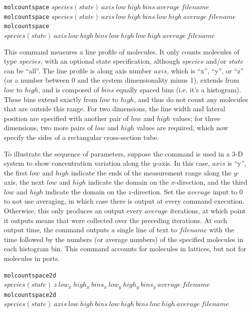 \documentclass {scrbook}
\newcommand {\ttt} {\texttt}
\begin{document}
\begin{description}
\item{\ttt{molcountspace} $species(state)\ axis\ low\ high\ bins\ average\ filename$\\
\ttt{molcountspace} $species(state)\ axis\ low\ high\ bins\ low\ high\ average\ filename$\\
\ttt{molcountspace} $species(state)\ axis\ low\ high\ bins\ low\ high\ low\ high\ average\ filename$}

This command measures a line profile of molecules. It only counts molecules of type $species$, with an optional state specification, although $species$ and/or $state$ can be ``all''. The line profile is along axis number $axis$, which is ``x'', ``y'', or ``z'' (or a number between 0 and the system dimensionality minus 1), extends from $low$ to $high$, and is composed of $bins$ equally spaced bins (i.e. it's a histogram). These bins extend exactly from $low$ to $high$, and thus do not count any molecules that are outside this range. For two dimensions, the line width and lateral position are specified with another pair of $low$ and $high$ values; for three dimensions, two more pairs of $low$ and $high$ values are required, which now specify the sides of a rectangular cross-section tube.

To illustrate the sequence of parameters, suppose the command is used in a 3-D system to show concentration variation along the $y$-axis. In this case, $axis$ is ``y'', the first $low$ and $high$ indicate the ends of the measurement range along the $y$-axis, the next $low$ and $high$ indicate the domain on the $x$-direction, and the third $low$ and $high$ indicate the domain on the $z$-direction. Set the $average$ input to 0 to not use averaging, in which case there is output at every command execution. Otherwise, this only produces an output every $average$ iterations, at which point it outputs means that were collected over the preceding iterations. At each output time, the command outputs a single line of text to $filename$ with the time followed by the numbers (or average numbers) of the specified molecules in each histogram bin. This command accounts for molecules in lattices, but not for molecules in ports.

\item{\ttt{molcountspace2d} $species(state)\ z\ low_x\ high_x\ bins_x\ low_y\ high_y\ bins_y\ average\ filename$\\
\ttt{molcountspace2d} $species(state)\ axis\ low\ high\ bins\ low\ high\ bins\ low\ high\ average\ filename$}


\end{description}
\end{document}
